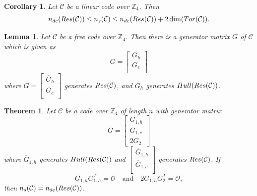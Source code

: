 \documentclass[10pt,a4paper]{amsart}
\newtheorem{corollary}{Corollary}
\newtheorem{lemma}{Lemma}
\newtheorem{theorem}{Theorem}
\begin{document}
\begin{corollary}\label{SOembeddingres}
    Let $\mathcal{C}$ be a linear code over $\mathbb{Z}_4$. Then
    \[
    n_{de}({\rm{Res}}(\mathcal{C}))\le n_s(\mathcal{C})\le n_{de}({\rm{Res}}(\mathcal{C}))+2\dim({\rm{Tor}}(\mathcal{C})).
    \]
\end{corollary}

\begin{lemma}\label{matrixform}
Let $\mathcal C$ be a free code over $\mathbb Z_4$. Then there is a generator matrix $G$ of $\mathcal{C}$ which is given as
\[
    G=
    \begin{bmatrix}
        G_{h}\\
        G_{c}\\
    \end{bmatrix}
\]
where $\overline{G}=\begin{bmatrix}
        \overline{G}_{h}\\
        \overline{G}_{c}\\
    \end{bmatrix}$ generates ${\rm Res}(\mathcal{C})$, and $\overline{G}_{h}$ generates ${\rm{Hull}}({\rm Res}(\mathcal{C}))$.
\end{lemma}

\begin{theorem}\label{Z4embeddingres}
Let $\mathcal C$ be a code over $\mathbb Z_4$ of length $n$ with generator matrix
\[
    G=
    \begin{bmatrix}
        G_{1, h}\\
        G_{1, c}\\
        2G_2
    \end{bmatrix}
\]
where $\overline{G}_{1, h}$ generates ${\rm{Hull}}({\rm Res}(\mathcal{C}))$ and $\begin{bmatrix}
        \overline{G}_{1, h}\\
        \overline{G}_{1, c}\\
    \end{bmatrix}$ generates ${\rm Res}(\mathcal{C})$.
If
\begin{equation}\label{lifthy}
    G_{1, h}G_{1, h}^T=\mathcal{O}\quad\mbox{and}\quad 2G_{1, h}G_2^T=\mathcal{O},
\end{equation}
then $n_s(\mathcal{C})=n_{de}({\rm Res}(\mathcal{C}))$.
\end{theorem}
\end{document}
